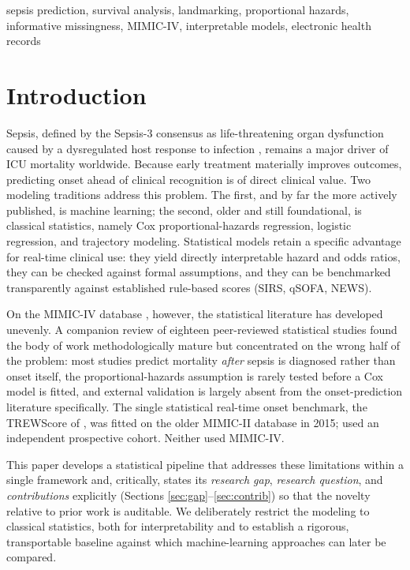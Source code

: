 \documentclass[conference]{IEEEtran}
\begin{document}
\begin{IEEEkeywords}
sepsis prediction, survival analysis, landmarking, proportional hazards,
informative missingness, MIMIC-IV, interpretable models, electronic health
records
\end{IEEEkeywords}

\section{Introduction}
Sepsis, defined by the Sepsis-3 consensus as life-threatening organ
dysfunction caused by a dysregulated host response to infection
\cite{singer2016sepsis3}, remains a major driver of ICU mortality worldwide.
Because early treatment materially improves outcomes, predicting onset ahead of
clinical recognition is of direct clinical value. Two modeling traditions
address this problem. The first, and by far the more actively published, is
machine learning; the second, older and still foundational, is classical
statistics, namely Cox proportional-hazards regression, logistic regression, and
trajectory modeling. Statistical models retain a specific advantage for
real-time clinical use: they yield directly interpretable hazard and odds
ratios, they can be checked against formal assumptions, and they can be
benchmarked transparently against established rule-based scores (SIRS, qSOFA,
NEWS).

On the MIMIC-IV database \cite{johnson2023mimiciv}, however, the statistical
literature has developed unevenly. A companion review of eighteen peer-reviewed
statistical studies found the body of work methodologically mature but
concentrated on the wrong half of the problem: most studies predict mortality
\emph{after} sepsis is diagnosed rather than onset itself, the
proportional-hazards assumption is rarely tested before a Cox model is fitted,
and external validation is largely absent from the onset-prediction literature
specifically. The single statistical real-time onset benchmark, the TREWScore
of \textcite{henry2015trewscore}, was fitted on the older
MIMIC-II database in 2015; \textcite{liaw2019mortality} used an
independent prospective cohort. Neither used MIMIC-IV.

This paper develops a statistical pipeline that addresses these limitations
within a single framework and, critically, states its \emph{research gap},
\emph{research question}, and \emph{contributions} explicitly (Sections
\ref{sec:gap}--\ref{sec:contrib}) so that the novelty relative to prior work is
auditable. We deliberately restrict the modeling to classical statistics, both
for interpretability and to establish a rigorous, transportable baseline
against which machine-learning approaches can later be compared.
\end{document}
